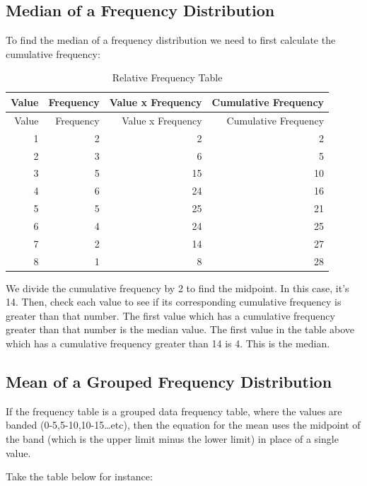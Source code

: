 \documentclass[
]{book}
\begin{document}
\hypertarget{median-of-a-frequency-distribution}{%
\subsection{Median of a Frequency Distribution}\label{median-of-a-frequency-distribution}}

To find the median of a frequency distribution we need to first calculate the cumulative frequency:

\begin{longtable}[]{@{}rrrr@{}}
\caption{\label{tab:table007}Relative Frequency Table}\tabularnewline
\toprule
Value & Frequency & Value x Frequency & Cumulative Frequency \\
\midrule
\endfirsthead
\toprule
Value & Frequency & Value x Frequency & Cumulative Frequency \\
\midrule
\endhead
1 & 2 & 2 & 2 \\
2 & 3 & 6 & 5 \\
3 & 5 & 15 & 10 \\
4 & 6 & 24 & 16 \\
5 & 5 & 25 & 21 \\
6 & 4 & 24 & 25 \\
7 & 2 & 14 & 27 \\
8 & 1 & 8 & 28 \\
\bottomrule
\end{longtable}

We divide the cumulative frequency by 2 to find the midpoint. In this case, it's 14. Then, check each value to see if its corresponding cumulative frequency is greater than that number. The first value which has a cumulative frequency greater than that number is the median value. The first value in the table above which has a cumulative frequency greater than 14 is 4. This is the median.

\hypertarget{mean-of-a-grouped-frequency-distribution}{%
\subsection{Mean of a Grouped Frequency Distribution}\label{mean-of-a-grouped-frequency-distribution}}

If the frequency table is a grouped data frequency table, where the values are banded (0-5,5-10,10-15\ldots etc), then the equation for the mean uses the midpoint of the band (which is the upper limit minus the lower limit) in place of a single value.

Take the table below for instance:
\end{document}
